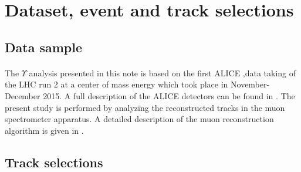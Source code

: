 \graphicspath{{Figures/Section1/}}

\section{\label{Data}Dataset, event and track selections}

\subsection{\label{Data}Data sample}

\paragraph{}
The $\Upsilon$ analysis presented in this note is based on the first ALICE \PbPb\sep data taking of the LHC run 2 at a center of mass energy  which took place in November-December 2015.
A full description of the ALICE detectors can be found in \cite{ALICEexpe}.
The present study is performed by analyzing the reconstructed tracks in the muon spectrometer apparatus.
A detailed description of the muon reconstruction algorithm is given in \cite{simuSpectro, LongJpsiPaper}.



\subsection{\label{TrackCut}Track selections}



